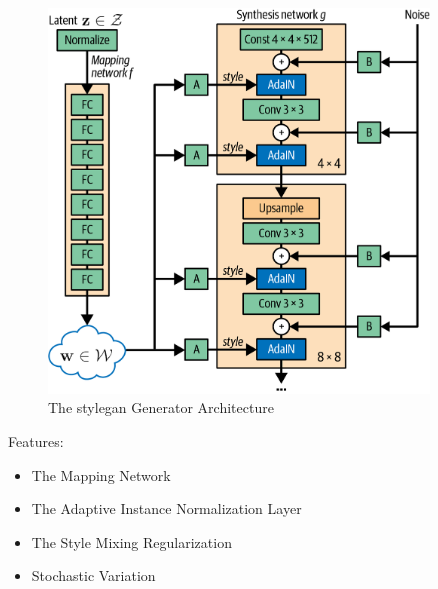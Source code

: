 \begin{figure}
	\begin{center}
		\includegraphics[width=0.9\textwidth]{figures/stylegan.png}
	\end{center}
	\caption{The \gls{stylegan} Generator Architecture}\label{fig:stylegan}
\end{figure}

Features:

\begin{itemize}
	\item The Mapping Network
	\item The Adaptive Instance Normalization Layer
	\item The Style Mixing Regularization
	\item Stochastic Variation
\end{itemize}

